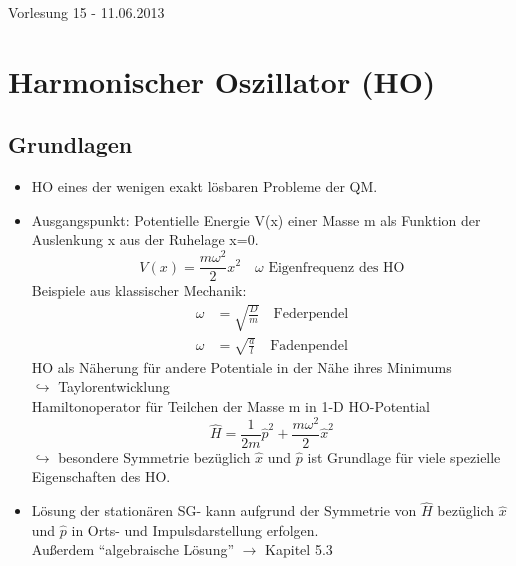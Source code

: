 \documentclass[10pt,article,colorback,accentcolor=tud9d]{scrartcl}
\begin{document}
\begin{flushright}
Vorlesung 15 - 11.06.2013
\end{flushright}
\section{Harmonischer Oszillator (HO)}
\subsection{Grundlagen}
\begin{itemize}
	\item HO eines der wenigen exakt lösbaren Probleme der QM.
  \item Ausgangspunkt: Potentielle Energie V(x) einer Masse m als Funktion der Auslenkung x aus der Ruhelage x=0.
    \begin{equation}
    V(x)=\frac{m\omega^2}{2}x^2\quad \text{$\omega$ Eigenfrequenz des HO}
    \end{equation}
    Beispiele aus klassischer Mechanik:
    \begin{align}
    \omega&=\sqrt{\frac{D}{m}}\quad \text{Federpendel}\\
    \omega&=\sqrt{\frac{a}{l}}\quad \text{Fadenpendel}
    \end{align}
    HO als Näherung für andere Potentiale in der Nähe ihres Minimums\\
    $\hookrightarrow$ Taylorentwicklung\\
    Hamiltonoperator für Teilchen der Masse m in 1-D HO-Potential
    \begin{equation}
    \hat{H}=\frac{1}{2m}\hat{p}^2+\frac{m\omega^2}{2}\hat{x}^2
    \end{equation}
    $\hookrightarrow$ besondere Symmetrie bezüglich $\hat{x}$ und $\hat{p}$ ist Grundlage für viele spezielle Eigenschaften des HO.
  \item Lösung der stationären SG- kann aufgrund der Symmetrie von $\hat{H}$ bezüglich $\hat{x}$ und $\hat{p}$ in Orts- und Impulsdarstellung erfolgen.\\
    Außerdem "`algebraische Lösung"' $\rightarrow$ Kapitel 5.3
\end{itemize}
\end{document}
